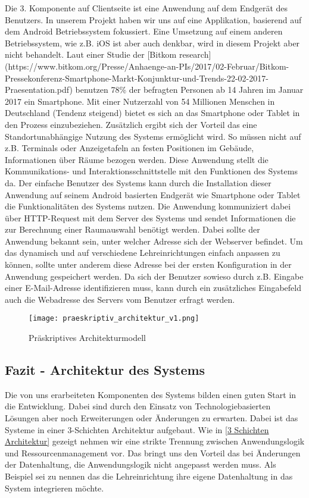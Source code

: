 Die 3. Komponente auf Clientseite ist eine Anwendung auf dem Endgerät des
Benutzers. In unserem Projekt haben wir uns auf eine Applikation, basierend auf
dem Android Betriebssystem fokussiert. Eine Umsetzung auf einem anderen
Betriebssystem, wie z.B. iOS ist aber auch denkbar, wird in diesem Projekt aber
nicht behandelt.
Laut einer Studie der [Bitkom research](https://www.bitkom.org/Presse/Anhaenge-an-PIs/2017/02-Februar/Bitkom-Pressekonferenz-Smartphone-Markt-Konjunktur-und-Trends-22-02-2017-Praesentation.pdf) 
benutzen 78\% der befragten Personen ab 14 Jahren im Januar 2017 ein Smartphone.
Mit einer Nutzerzahl von 54 Millionen Menschen in Deutschland (Tendenz steigend)
bietet es sich an das Smartphone oder Tablet in den Prozess einzubeziehen.
Zusätzlich ergibt sich der Vorteil das eine Standortunabhängige Nutzung des
Systems ermöglicht wird. So müssen nicht auf z.B. Terminals oder Anzeigetafeln
an festen Positionen im Gebäude, Informationen über Räume bezogen werden. 
Diese Anwendung stellt die Kommunikations-  und Interaktionsschnittstelle mit
den Funktionen des Systems da. Der einfache Benutzer des Systems kann durch die
Installation dieser Anwendung auf seinem Android basierten Endgerät wie \zB
Smartphone oder Tablet die Funktionalitäten des Systems nutzen. Die Anwendung
kommuniziert dabei über HTTP-Request mit dem Server des Systems und sendet
Informationen die zur Berechnung einer Raumauswahl benötigt werden.
Dabei sollte der Anwendung bekannt sein, unter welcher Adresse sich der
Webserver befindet. Um das dynamisch und auf verschiedene Lehreinrichtungen
einfach anpassen zu können, sollte unter anderem diese Adresse bei der ersten
Konfiguration in der Anwendung gespeichert werden. Da sich der Benutzer sowieso
durch z.B. Eingabe einer E-Mail-Adresse identifizieren muss, kann durch ein
zusätzliches Eingabefeld auch die Webadresse des Servers vom Benutzer erfragt
werden.

\begin{figure}
	\centering
	\texttt{[image: praeskriptiv\_architektur\_v1.png]}
	\caption{Präskriptives Architekturmodell}
\end{figure}

\subsection{Fazit - Architektur des Systems}
\label{Fazit - Architektur des Systems}

Die von uns erarbeiteten Komponenten des Systems bilden einen guten Start in
die Entwicklung. Dabei sind durch den Einsatz von Technologiebasierten Lösungen
aber noch Erweiterungen oder Änderungen zu erwarten.
Dabei ist das Systeme in einer 3-Schichten Architektur aufgebaut.
Wie in \ref{3 Schichten Architektur} gezeigt nehmen wir eine strikte Trennung
zwischen Anwendungslogik und Ressourcenmanagement vor. Das bringt uns den
Vorteil das bei Änderungen der Datenhaltung, die Anwendungslogik nicht
angepasst werden muss. Als Beispiel sei zu nennen das die Lehreinrichtung ihre
eigene Datenhaltung in das System integrieren möchte.

